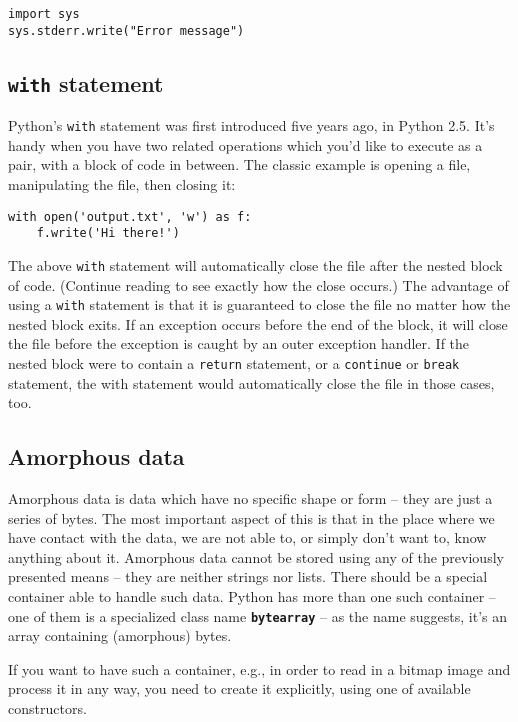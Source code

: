 \documentclass[11pt]{article}
\begin{document}
\begin{verbatim}
import sys
sys.stderr.write("Error message")
\end{verbatim}


\subsection{\texttt{with} statement}
\label{sec:org6594fc4}
Python’s \texttt{with} statement was first introduced five years ago, in Python
2.5. It’s handy when you have two related operations which you’d like
to execute as a pair, with a block of code in between. The classic
example is opening a file, manipulating the file, then closing it:

\begin{verbatim}
with open('output.txt', 'w') as f:
    f.write('Hi there!')
\end{verbatim}

The above \texttt{with} statement will automatically close the file after the
nested block of code. (Continue reading to see exactly how the close
occurs.) The advantage of using a \texttt{with} statement is that it is
guaranteed to close the file no matter how the nested block exits. If
an exception occurs before the end of the block, it will close the
file before the exception is caught by an outer exception handler. If
the nested block were to contain a \texttt{return} statement, or a \texttt{continue}
or \texttt{break} statement, the with statement would automatically close the
file in those cases, too.

\newpage


\subsection{Amorphous data}
\label{sec:org1e57dcd}
Amorphous data is data which have no specific shape or form – they are
just a series of bytes. The most important aspect of this is that in
the place where we have contact with the data, we are not able to, or
simply don’t want to, know anything about it. Amorphous data cannot be
stored using any of the previously presented means – they are neither
strings nor lists. There should be a special container able to handle
such data. Python has more than one such container – one of them is a
specialized class name \textbf{\texttt{bytearray}} – as the name suggests, it’s an array
containing (amorphous) bytes.

If you want to have such a container, e.g., in order to read in a
bitmap image and process it in any way, you need to create it
explicitly, using one of available constructors.
\end{document}
